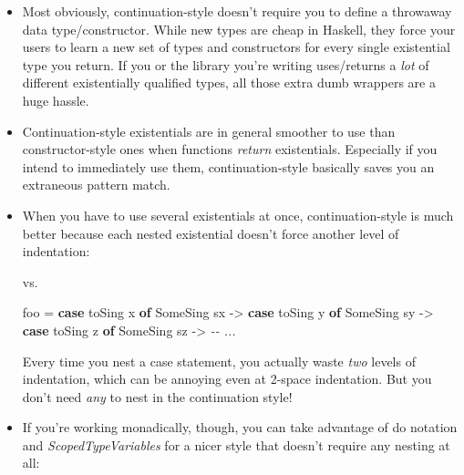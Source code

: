 \documentclass[]{article}
\newenvironment{Shaded}{}{}
\newcommand{\CommentTok}[1]{\textcolor[rgb]{0.38,0.63,0.69}{\textit{#1}}}
\newcommand{\DataTypeTok}[1]{\textcolor[rgb]{0.56,0.13,0.00}{#1}}
\newcommand{\KeywordTok}[1]{\textcolor[rgb]{0.00,0.44,0.13}{\textbf{#1}}}
\newcommand{\NormalTok}[1]{#1}
\newcommand{\OperatorTok}[1]{\textcolor[rgb]{0.40,0.40,0.40}{#1}}
\newcommand{\OtherTok}[1]{\textcolor[rgb]{0.00,0.44,0.13}{#1}}
\begin{document}
\begin{itemize}
\item
  Most obviously, continuation-style doesn't require you to define a throwaway
  data type/constructor. While new types are cheap in Haskell, they force your
  users to learn a new set of types and constructors for every single
  existential type you return. If you or the library you're writing uses/returns
  a \emph{lot} of different existentially qualified types, all those extra dumb
  wrappers are a huge hassle.
\item
  Continuation-style existentials are in general smoother to use than
  constructor-style ones when functions \emph{return} existentials. Especially
  if you intend to immediately use them, continuation-style basically saves you
  an extraneous pattern match.
\item
  When you have to use several existentials at once, continuation-style is much
  better because each nested existential doesn't force another level of
  indentation:

\begin{Shaded}
\end{Shaded}

  vs.

\begin{Shaded}
\begin{Highlighting}[]
\NormalTok{foo }\OtherTok{=} \KeywordTok{case}\NormalTok{ toSing x }\KeywordTok{of}
        \DataTypeTok{SomeSing}\NormalTok{ sx }\OtherTok{{-}\textgreater{}}
          \KeywordTok{case}\NormalTok{ toSing y }\KeywordTok{of}
            \DataTypeTok{SomeSing}\NormalTok{ sy }\OtherTok{{-}\textgreater{}}
              \KeywordTok{case}\NormalTok{ toSing z }\KeywordTok{of}
                \DataTypeTok{SomeSing}\NormalTok{ sz }\OtherTok{{-}\textgreater{}}
                  \CommentTok{{-}{-} ...}
\end{Highlighting}
\end{Shaded}

  Every time you nest a case statement, you actually waste \emph{two} levels of
  indentation, which can be annoying even at 2-space indentation. But you don't
  need \emph{any} to nest in the continuation style!
\item
  If you're working monadically, though, you can take advantage of do notation
  and \emph{ScopedTypeVariables} for a nicer style that doesn't require any
  nesting at all:


\end{itemize}
\end{document}

